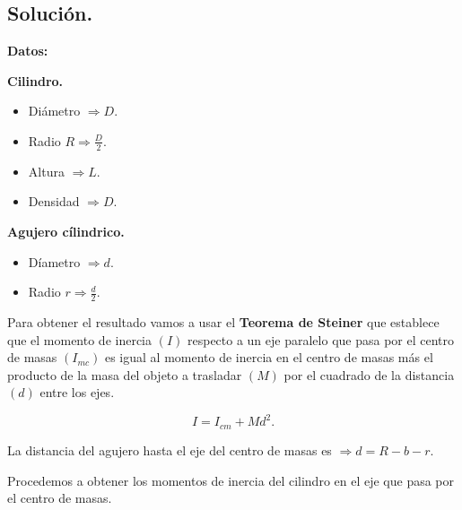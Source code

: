\documentclass[a4paper,12pt]{article} %
\begin{document}
\subsection{Solución.}


\vspace{\baselineskip}

\textbf{Datos:}

\vspace{\baselineskip}


\textbf{Cilindro.}
\begin{itemize}
    \item Diámetro \( \Rightarrow D.\)
    \item Radio \(R \Rightarrow \frac{D}{2}\).
    \item Altura \(\Rightarrow L.\)
    \item Densidad \( \Rightarrow D.\)
\end{itemize}

\vspace{\baselineskip}

\textbf{Agujero cílindrico.}
\begin{itemize}
    \item Díametro \(\Rightarrow d.\)
    \item Radio \( r \Rightarrow \frac{d}{2}.\)
\end{itemize}


\vspace{\baselineskip}

\begin{justify}
    Para obtener el resultado vamos a usar el \textbf{Teorema de Steiner} que establece que el momento de inercia \((I)\) respecto a un eje paralelo que pasa por el centro de masas \((I_{mc})\) es igual al momento de inercia en el centro de masas 
    más el producto de la masa del objeto a trasladar \((M)\) por el cuadrado de la distancia \((d)\) entre los ejes.

\end{justify}

\[I = I_{cm} + Md^2.\]

\begin{justify}
    La distancia del agujero hasta el eje del centro de masas es  \(\Rightarrow d = R - b - r\). 
\end{justify}

\begin{justify}
    Procedemos a obtener los momentos de inercia del cilindro en el eje que pasa por el centro de masas.
\end{justify}
\end{document}
